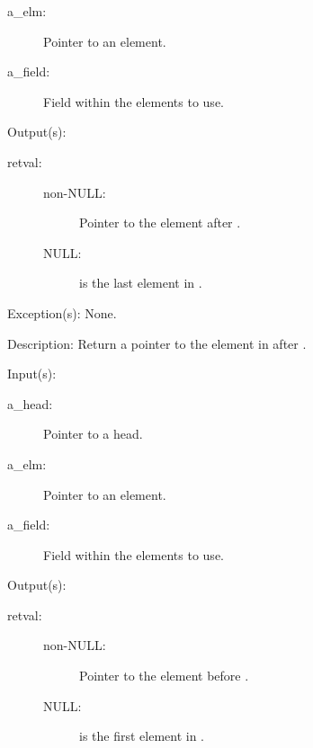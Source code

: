 \begin{capi}
\begin{capilist}
\begin{description}
		\item[a\_elm: ]
			Pointer to an element.
		\item[a\_field: ]
			Field within the  elements to use.
		\end{description}
	\item[Output(s): ]
		\begin{description}\item[]
		\item[retval: ]
			\begin{description}\item[]
			\item[non-NULL: ]
				Pointer to the element after .
			\item[NULL: ]
				 is the last element in
				.
			\end{description}
		\end{description}
	\item[Exception(s): ] None.
	\item[Description: ]
		Return a pointer to the element in  after
		.
	\end{capilist}
\label{ql_prev}
	\begin{capilist}
	\item[Input(s): ]
		\begin{description}\item[]
		\item[a\_head: ]
			Pointer to a  head.
		\item[a\_elm: ]
			Pointer to an element.
		\item[a\_field: ]
			Field within the  elements to use.
		\end{description}
	\item[Output(s): ]
		\begin{description}\item[]
		\item[retval: ]
			\begin{description}\item[]
			\item[non-NULL: ]
				Pointer to the element before .
			\item[NULL: ]
				 is the first element in
				.
			\end{description}

\end{description}
\end{capilist}
\end{capi}

